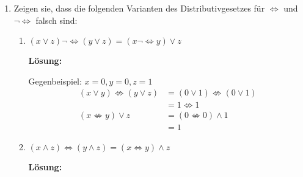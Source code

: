 \documentclass[paper=a4,fontsize=11pt]{scrartcl}%
\numberwithin{equation}{section}
\newenvironment{solution}
	{
		\color{Blue}
		\textbf{Lösung:}
	}{}
\begin{document}
\begin{enumerate}
\begin{enumerate}
		\begin{solution}
		
		Die Beziehung ist gültig!
		\begin{align*}
		&~ x \Leftrightarrow y \Leftrightarrow z \\
		&= (x \Leftrightarrow y) \Leftrightarrow z \\
		&= (\overline{\overline{x \Leftrightarrow y}}) \Leftrightarrow z\\
		&= (\overline{x \Leftrightarrow y}) \not \Leftrightarrow z\\
		&= (x \not \Leftrightarrow y) \not \Leftrightarrow z\\
		&= x \not \Leftrightarrow y \not \Leftrightarrow z\\
		\end{align*}
		\textbf{Die Äquivalenz gilt nur, wenn die Anzahl der Operanden ungerade ist}
		\end{solution}
	\end{enumerate}
	\item Zeigen sie, dass die folgenden Varianten des Distributivgesetzes für $\Leftrightarrow$ und $\neg \Leftrightarrow$ falsch sind:
	\begin{enumerate}[resume]
		\item $(x \lor z) \neg \Leftrightarrow (y \lor z) = (x \neg \Leftrightarrow y) \lor z$
		
		\begin{solution}

		Gegenbeispiel: $x= 0,y= 0,z= 1$
		\begin{align*}
		(x \lor y) \not \Leftrightarrow (y \lor z) &= (0 \lor 1) \not \Leftrightarrow (0 \lor 1)\\
		&= 1 \not \Leftrightarrow 1\\
		(x \not \Leftrightarrow y) \lor z &= (0 \not \Leftrightarrow 0) \land 1\\
		&= 1
		\end{align*}
		\end{solution}
		\item $(x \land z) \Leftrightarrow (y \land z) = (x \Leftrightarrow y) \land z$
		
		\begin{solution}
		

\end{solution}
\end{enumerate}
\end{enumerate}
\end{document}
